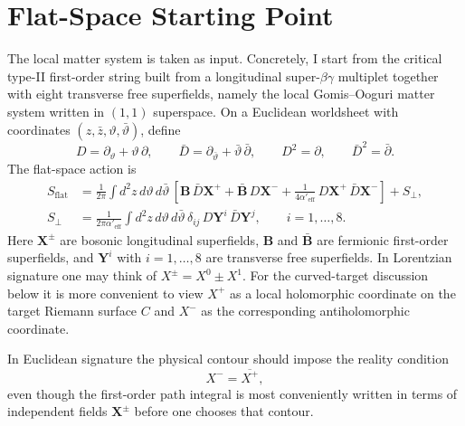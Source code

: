 \documentclass[11pt]{article}
\newcommand{\Aeff}{\alpha'_{\mathrm{eff}}}
\begin{document}
\section{Flat-Space Starting Point}
The local matter system is taken as input. Concretely, I start from the critical type-II first-order string built from a longitudinal super-$\beta\gamma$ multiplet together with eight transverse free superfields, namely the local Gomis--Ooguri matter system written in $(1,1)$ superspace. On a Euclidean worldsheet with coordinates $(z,\bar z,\vartheta,\bar\vartheta)$, define
\begin{equation}\label{eq:superderivatives}
D=\partial_\vartheta+\vartheta\,\partial,
\qquad
\bar D=\partial_{\bar\vartheta}+\bar\vartheta\,\bar\partial,
\qquad
D^2=\partial,
\qquad
\bar D^2=\bar\partial.
\end{equation}
The flat-space action is
\begin{equation}\label{eq:flat-action}
\begin{aligned}
S_{\mathrm{flat}}
&=
\frac{1}{2\pi}\int d^2z\,d\vartheta\,d\bar\vartheta\,
\left[
\mathbf B\,\bar D\mathbf X^+
+\bar{\mathbf B}\,D\mathbf X^-
+\frac{1}{4\Aeff}\,D\mathbf X^+\,\bar D\mathbf X^-
\right]
+S_\perp,
\\
S_\perp
&=
\frac{1}{2\pi \Aeff}\int d^2z\,d\vartheta\,d\bar\vartheta\,
\delta_{ij}\,D\mathbf Y^i\,\bar D\mathbf Y^j,
\qquad i=1,\dots,8.
\end{aligned}
\end{equation}
Here $\mathbf X^\pm$ are bosonic longitudinal superfields, $\mathbf B$ and $\bar{\mathbf B}$ are fermionic first-order superfields, and $\mathbf Y^i$ with $i=1,\dots,8$ are transverse free superfields.
In Lorentzian signature one may think of $X^\pm=X^0\pm X^1$. For the curved-target discussion below it is more convenient to view $X^+$ as a local holomorphic coordinate on the target Riemann surface $C$ and $X^-$ as the corresponding antiholomorphic coordinate.

In Euclidean signature the physical contour should impose the reality condition
\begin{equation}\label{eq:euclidean-reality}
X^-=\overline{X^+},
\end{equation}
even though the first-order path integral is most conveniently written in terms of independent fields $\mathbf X^\pm$ before one chooses that contour.
\end{document}
